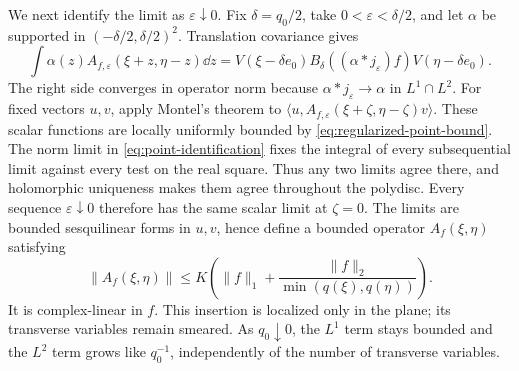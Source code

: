 We next identify the limit as $\varepsilon\downarrow0$. Fix
$\delta=q_0/2$, take $0<\varepsilon<\delta/2$, and let $\alpha$ be
supported in $(-\delta/2,\delta/2)^2$. Translation covariance gives
\begin{equation}\label{eq:point-identification}
 \int\alpha(z)A_{f,\varepsilon}(\xi+z,\eta-z)\dd z
 =V(\xi-\delta e_0)B_\delta((\alpha*j_\varepsilon)f)
           V(\eta-\delta e_0).
\end{equation}
The right side converges in operator norm because
$\alpha*j_\varepsilon\to\alpha$ in $L^1\cap L^2$.
For fixed vectors $u,v$, apply Montel's theorem to
$\langle u,A_{f,\varepsilon}(\xi+\zeta,\eta-\zeta)v\rangle$.
These scalar functions are locally uniformly bounded by
\eqref{eq:regularized-point-bound}. The norm limit in
\eqref{eq:point-identification} fixes the integral of every
subsequential limit against every test on the real square. Thus any
two limits agree there, and holomorphic uniqueness makes them agree
throughout the polydisc. Every sequence $\varepsilon\downarrow0$
therefore has the same scalar limit at $\zeta=0$. The limits are
bounded sesquilinear forms in $u,v$, hence define a bounded operator
$A_f(\xi,\eta)$ satisfying
\begin{equation}\label{eq:point-bound}
 \|A_f(\xi,\eta)\|\leq
 K\left(\|f\|_1+\frac{\|f\|_2}{\min(q(\xi),q(\eta))}\right).
\end{equation}
It is complex-linear in $f$. This insertion is localized only in the
plane; its transverse variables remain smeared. As $q_0\downarrow0$,
the $L^1$ term stays bounded and the $L^2$ term grows like $q_0^{-1}$,
independently of the number of transverse variables.

